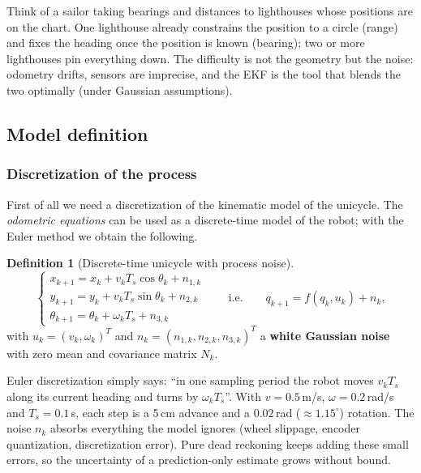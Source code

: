 \documentclass[11pt,a4paper]{article}
\def\bm#1{#1}%
\newcommand{\slides}[1]{\texorpdfstring{\hspace{0.5em}{\normalfont\small\emph{(#1)}}}{}}
\theoremstyle{definition}
\newtheorem{definition}{Definition}[section]
\theoremstyle{plain}
\theoremstyle{remark}
\begin{document}
\begin{intuition}
Think of a sailor taking bearings and distances to lighthouses whose positions are on the chart. One lighthouse already constrains the position to a circle (range) and fixes the heading once the position is known (bearing); two or more lighthouses pin everything down. The difficulty is not the geometry but the noise: odometry drifts, sensors are imprecise, and the EKF is the tool that blends the two optimally (under Gaussian assumptions).
\end{intuition}

\subsection{Model definition}
\slides{slides 5--7}

\subsubsection*{Discretization of the process}
First of all we need a discretization of the kinematic model of the unicycle. The \emph{odometric equations} can be used as a discrete-time model of the robot; with the Euler method we obtain the following.

\begin{definition}[Discrete-time unicycle with process noise]
\label{def:process}
\[
\begin{cases}
x_{k+1}=x_k+v_k T_s\cos\theta_k+n_{1,k}\\
y_{k+1}=y_k+v_k T_s\sin\theta_k+n_{2,k}\\
\theta_{k+1}=\theta_k+\omega_k T_s+n_{3,k}
\end{cases}
\qquad\text{i.e.}\qquad
\bm q_{k+1}=\bm f(\bm q_k,\bm u_k)+\bm n_k ,
\]
with $\bm u_k=(v_k,\omega_k)^T$ and $\bm n_k=(n_{1,k},n_{2,k},n_{3,k})^T$ a \textbf{white Gaussian noise} with zero mean and covariance matrix $\bm N_k$.
\end{definition}

\begin{intuition}
Euler discretization simply says: ``in one sampling period the robot moves $v_kT_s$ along its current heading and turns by $\omega_kT_s$''. With $v=0.5$\,m/s, $\omega=0.2$\,rad/s and $T_s=0.1$\,s, each step is a 5\,cm advance and a $0.02$\,rad ($\approx1.15^\circ$) rotation. The noise $\bm n_k$ absorbs everything the model ignores (wheel slippage, encoder quantization, discretization error). Pure dead reckoning keeps adding these small errors, so the uncertainty of a prediction-only estimate grows without bound.
\end{intuition}
\end{document}
